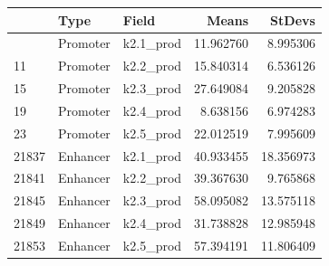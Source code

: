\documentclass[
  letterpaper,
  DIV=11,
  numbers=noendperiod]{scrartcl}
\begin{document}
\begin{longtable}[]{@{}lllrr@{}}
\toprule\noalign{}
& Type & Field & Means & StDevs \\
\midrule\noalign{}
\endhead
\bottomrule\noalign{}
\endlastfoot
7 & Promoter & k2.1\_prod & 11.962760 & 8.995306 \\
11 & Promoter & k2.2\_prod & 15.840314 & 6.536126 \\
15 & Promoter & k2.3\_prod & 27.649084 & 9.205828 \\
19 & Promoter & k2.4\_prod & 8.638156 & 6.974283 \\
23 & Promoter & k2.5\_prod & 22.012519 & 7.995609 \\
21837 & Enhancer & k2.1\_prod & 40.933455 & 18.356973 \\
21841 & Enhancer & k2.2\_prod & 39.367630 & 9.765868 \\
21845 & Enhancer & k2.3\_prod & 58.095082 & 13.575118 \\
21849 & Enhancer & k2.4\_prod & 31.738828 & 12.985948 \\
21853 & Enhancer & k2.5\_prod & 57.394191 & 11.806409 \\
\end{longtable}
\end{document}
